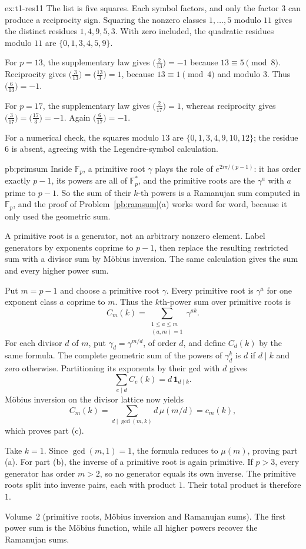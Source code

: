 \begin{solution}{ex:t1-res11}
\idea The list is five squares. Each symbol factors, and only the factor $3$ can produce a reciprocity sign.
\writeup Squaring the nonzero classes $1,\ldots,5$ modulo $11$ gives the distinct residues $1,4,9,5,3$. With zero included, the quadratic residues modulo $11$ are $\{0,1,3,4,5,9\}$.

For $p=13$, the supplementary law gives $\bigl(\frac2{13}\bigr)=-1$ because $13\equiv5\pmod8$. Reciprocity gives
$\bigl(\frac3{13}\bigr)=\bigl(\frac{13}3\bigr)=1$, because $13\equiv1\pmod4$ and modulo $3$. Thus
$\bigl(\frac6{13}\bigr)=-1$.

For $p=17$, the supplementary law gives $\bigl(\frac2{17}\bigr)=1$, whereas reciprocity gives
$\bigl(\frac3{17}\bigr)=\bigl(\frac{17}3\bigr)=-1$. Again $\bigl(\frac6{17}\bigr)=-1$.

For a numerical check, the squares modulo $13$ are
$\{0,1,3,4,9,10,12\}$; the residue $6$ is absent, agreeing with the Legendre-symbol calculation.
\end{solution}

\begin{solution}{pb:primsum}
\idea Inside $\mathbb F_p$, a primitive root $\gamma$ plays the role of $e^{2i\pi/(p-1)}$: it has order exactly $p-1$, its
powers are all of $\mathbb F_p^*$, and the primitive roots are the $\gamma^a$ with $a$ prime to $p-1$. So the sum of their
$k$-th powers is a Ramanujan sum computed in $\mathbb F_p$, and the proof of Problem~\ref{pb:ramsum}(a) works word for word,
because it only used the geometric sum.

\writeup
A primitive root is a generator, not an arbitrary nonzero element. Label generators by exponents coprime to $p-1$, then replace the resulting restricted sum with a divisor sum by Möbius inversion. The same calculation gives the sum and every higher power sum.

 Put $m=p-1$ and choose a primitive root $\gamma$. Every primitive root is $\gamma^a$ for one exponent class $a$ coprime to $m$. Thus the $k$th-power sum over primitive roots is
\[
C_m(k)=\sum_{\substack{1\le a\le m\\(a,m)=1}}\gamma^{ak}.
\]
For each divisor $d$ of $m$, put $\gamma_d=\gamma^{m/d}$, of order $d$, and define $C_d(k)$ by the same formula. The complete geometric sum of the powers of $\gamma_d^k$ is $d$ if $d\mid k$ and zero otherwise. Partitioning its exponents by their gcd with $d$ gives
\[
\sum_{e\mid d}C_e(k)=d\,\mathbf1_{d\mid k}.
\]
Möbius inversion on the divisor lattice now yields
\[
C_m(k)=\sum_{d\mid\gcd(m,k)}d\,\mu(m/d)=c_m(k),
\]
which proves part (c).

Take $k=1$. Since $\gcd(m,1)=1$, the formula reduces to $\mu(m)$, proving part (a). For part (b), the inverse of a primitive root is again primitive. If $p>3$, every generator has order $m>2$, so no generator equals its own inverse. The primitive roots split into inverse pairs, each with product $1$. Their total product is therefore $1$.

\tools Volume~2 (primitive roots, Möbius inversion and Ramanujan sums).
\leads The first power sum is the Möbius function, while all higher powers recover the Ramanujan sums.
\end{solution}

